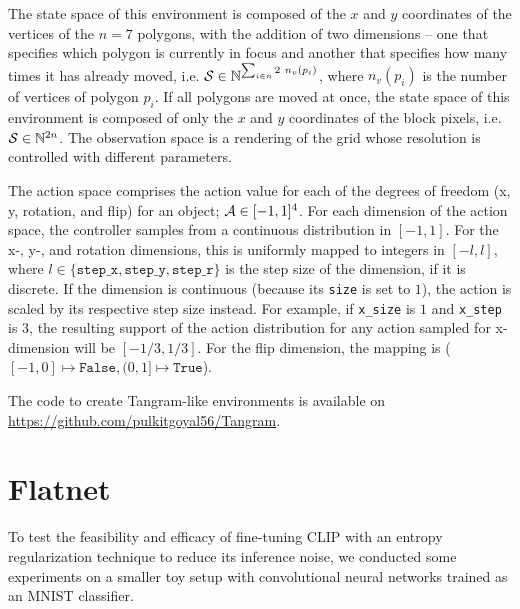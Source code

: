 The state space of this environment is composed of the \(x\) and \(y\) coordinates of the vertices of the \(n = 7\) polygons, with the addition of two dimensions -- one that specifies which polygon is currently in focus and another that specifies how many times it has already moved, i.e. \(\mathcal{S} \in \mathbb{N}^{\sum_{i \in n} 2\ n_v(p_i)}\), where \(n_v(p_i)\) is the number of vertices of polygon \(p_i\).
If all polygons are moved at once, the state space of this environment is composed of only the \(x\) and \(y\) coordinates of the block pixels, i.e. \(\mathcal{S} \in \mathbb{N}^{2 n}\).
The observation space is a rendering of the grid whose resolution is controlled with different parameters.

The action space comprises the action value for each of the degrees of freedom (x, y, rotation, and flip) for an object; \(\mathcal{A} \in [-1, 1]^4\).
For each dimension of the action space, the controller samples from a continuous distribution in \([-1, 1]\).
For the x-, y-, and rotation dimensions, this is uniformly mapped to integers in \([-l, l]\), where \(l \in \{\texttt{step\_x}, \texttt{step\_y}, \texttt{step\_r}\}\) is the step size of the dimension, if it is discrete.
If the dimension is continuous (because its \texttt{size} is set to \(1\)), the action is scaled by its respective step size instead.
For example, if \texttt{x\_size} is \(1\) and \texttt{x\_step} is \(3\), the resulting support of the action distribution for any action sampled for x-dimension will be \([-1/3, 1/3]\). For the flip dimension, the mapping is (\([-1, 0] \mapsto \texttt{False}, (0, 1] \mapsto \texttt{True}\)).

The code to create Tangram-like environments is available on \url{https://github.com/pulkitgoyal56/Tangram}.


\chapter{Flatnet}
\label{sec:flatnet}
To test the feasibility and efficacy of fine-tuning CLIP with an entropy regularization technique to reduce its inference noise, we conducted some experiments on a smaller toy setup with convolutional neural networks trained as an MNIST classifier.




